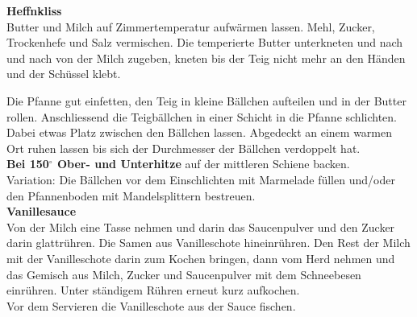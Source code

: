 \vspace*{\fill}
\begin{multicols}{2}
\textbf{Heffnkliss}\\
Butter und Milch auf Zimmertemperatur aufwärmen lassen.
Mehl, Zucker, Trockenhefe und Salz vermischen.
Die temperierte Butter unterkneten und nach und nach von der Milch zugeben, kneten bis
der Teig nicht mehr an den Händen und der Schüssel klebt.

Die Pfanne gut einfetten, den Teig in kleine Bällchen aufteilen und in der Butter rollen.
Anschliessend die Teigbällchen in einer Schicht in die Pfanne schlichten. 
Dabei etwas Platz zwischen den Bällchen lassen. Abgedeckt an einem 
warmen Ort ruhen lassen bis sich der Durchmesser der Bällchen verdoppelt hat.\\
\textbf{Bei 150$^\circ$ Ober- und Unterhitze} auf der mittleren Schiene backen.\\

Variation: Die Bällchen vor dem Einschlichten mit Marmelade füllen und/oder den Pfannenboden
mit Mandelsplittern bestreuen.\\

\textbf{Vanillesauce}\\
Von der Milch eine Tasse nehmen und darin das Saucenpulver und den Zucker darin glattrühren.
Die Samen aus Vanilleschote hineinrühren.
Den Rest der Milch mit der Vanilleschote darin zum Kochen bringen, dann vom Herd nehmen und das Gemisch aus Milch, 
Zucker und Saucenpulver mit dem Schneebesen einrühren.
Unter ständigem Rühren erneut kurz aufkochen.\\
Vor dem Servieren die Vanilleschote aus der Sauce fischen.



\end{multicols}
\vfill
